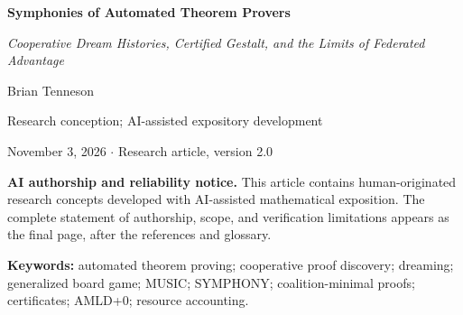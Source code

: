 \documentclass[11pt,letterpaper]{article}
\theoremstyle{definition}
\theoremstyle{remark}
\begin{document}
\begin{center}
{\LARGE\bfseries Symphonies of Automated Theorem Provers\par}
\vspace{4pt}
{\large\itshape Cooperative Dream Histories, Certified Gestalt, and the Limits of Federated Advantage\par}
\vspace{9pt}
{\large Brian Tenneson\par}
\vspace{3pt}
{\small Research conception; AI-assisted expository development\par}
\vspace{4pt}
{\small November 3, 2026 \quad $\cdot$ \quad Research article, version 2.0\par}
\end{center}
\vspace{2pt}
\begin{center}
\begin{minipage}{.94\textwidth}
\footnotesize\noindent\textbf{AI authorship and reliability notice.} This article contains human-originated research concepts developed with AI-assisted mathematical exposition. The complete statement of authorship, scope, and verification limitations appears as the final page, after the references and glossary.
\end{minipage}
\end{center}
\vspace{7pt}
\begin{abstract}
Can five cooperating automated theorem provers (ATPs) produce a checkable proof unavailable to any one member under its initial evidence restrictions? We model an ATP symphony as a family of legal execution scores recording local dreams, causal order, authenticated messages, and verification events. Each dream is a union of typed reports; an ATP's MUSIC is the powerset of its possible dreams. We distinguish the whole score family from the subfamily witnessing an accepted target proof. A five-member Horn instance yields a coalition-minimal target, and an explicit finite generalized-board-game protocol constructs a legal certificate-bearing run. We show when a score preserves proof-relevant history and prove that verifier-gated admissions conserve the global logical consequence set. Counterexamples explain why unordered reports lose information and why individually possible dreams may be incompatible. Conditional simulation and cost-accounting results rule out unconditional claims of speedup. The Horn witness and related federation results have precedents in Tenneson's earlier dreaming paper; the structured score and its fidelity conditions are developed here as an extension. The results concern stipulated mathematical models, not an implemented AMLD+0 federation, independently machine-checked proofs, or measured computational improvements.
\end{abstract}
\noindent\textbf{Keywords:} automated theorem proving; cooperative proof discovery; dreaming; generalized board game; MUSIC; SYMPHONY; coalition-minimal proofs; certificates; AMLD+0; resource accounting.
\tableofcontents
\vspace{4pt}
\end{document}
